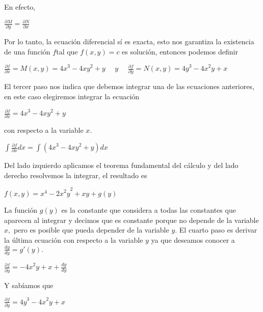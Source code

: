 \documentclass[l etterpaper,11pt]{article}
\begin{document}
En efecto,
\begin{center}
$\frac{\partial M}{\partial y}=\frac{\partial N}{\partial x}$\\
\end{center}

Por lo tanto, la ecuación diferencial sí es exacta, esto nos garantiza la existencia de una función $ f $tal que $ f(x,y)=c $ es solución, entonces podemos definir
\begin{center}

$\frac{\partial f}{\partial x}=M(x,y)={4x}^3-{4xy}^2+y\ \ \ \ \ \ y\ \ \ \ \ \ \frac{\partial f}{\partial y}=N(x,y)={4y}^3-{4x}^2y+x$\\

\end{center}

El tercer paso nos indica que debemos integrar una de las ecuaciones anteriores, en este caso elegiremos integrar la ecuación
\begin{center}

$\frac{\partial f}{\partial x}={4x}^3-{4xy}^2+y$\\
\end{center}

con respecto a la variable $ x.$
\begin{center}

$\int\frac{\partial f}{\partial x}dx=\int({4x}^3-{4xy}^2+y)dx$\\
\end{center}

Del lado izquierdo aplicamos el teorema fundamental del cálculo y del lado derecho resolvemos la integrar, el resultado es
\begin{center}

$f(x,y)=x^4-{{2x}^2y}^2+xy+g(y)$\\
\end{center}

La función $ g(y) $ es la constante que considera a todas las constantes que aparecen al integrar y decimos que es constante porque no depende de la variable $ x, $ pero es posible que pueda depender de la variable $y$.
El cuarto paso es derivar la última ecuación con respecto a la variable $ y $ ya que deseamos conocer a $\frac{dg}{dy}=g\prime(y).$
\begin{center}

$\frac{\partial f}{\partial y}=-{4x}^2y+x+\frac{dg}{dy}$\\
\end{center}

Y sabíamos que
\begin{center}

$\frac{\partial f}{\partial y}={4y}^3-{4x}^2y+x$\\
\end{center}
\end{document}

